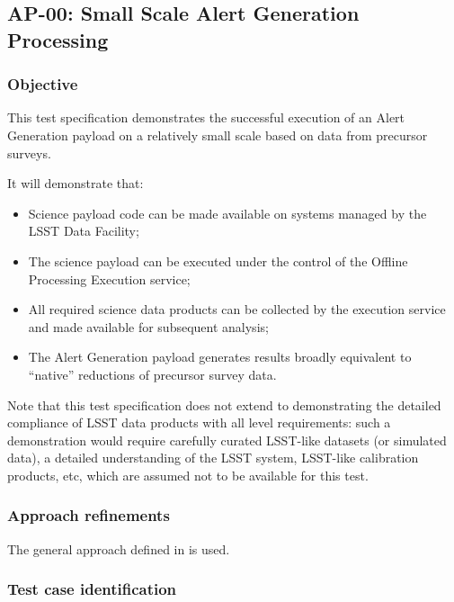 \subsection{AP-00: Small Scale Alert Generation Processing}
\label{drp-00}

\subsubsection{Objective}

This test specification demonstrates the successful execution of an
Alert Generation payload on a relatively small scale based on data from
precursor surveys.

It will demonstrate that:

\begin{itemize}

  \item{Science payload code can be made available on systems managed by the
  LSST Data Facility;}

  \item{The science payload can be executed under the
  control of the Offline Processing Execution service;}

  \item{All required science data products can be collected by the execution
  service and made available for subsequent analysis;}

  \item{The Alert Generation payload generates results broadly
  equivalent to ``native'' reductions of precursor survey data.}

\end{itemize}

Note that this test specification does not extend to demonstrating the
detailed compliance of LSST data products with all  level requirements: such a demonstration would
require carefully curated LSST-like datasets (or simulated data), a detailed
understanding of the LSST system, LSST-like calibration products, etc, which
are assumed not to be available for this test.

\subsubsection{Approach refinements}

The general approach defined in  is used.

\subsubsection{Test case identification}

